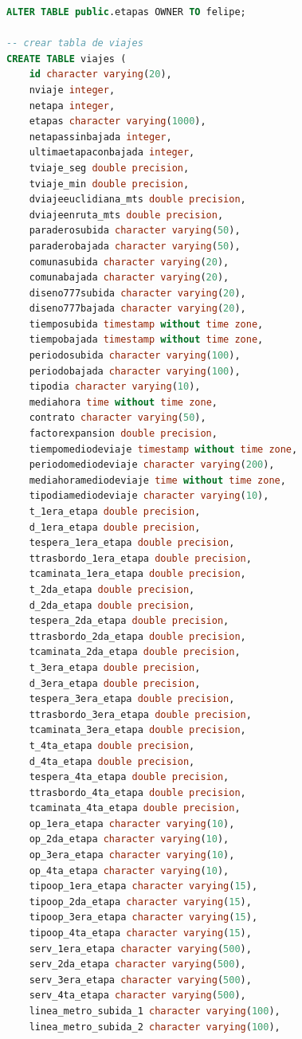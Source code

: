 \documentclass[12pt]{article}
\begin{document}
\begin{lstlisting}[breaklines=true, 
				   language=SQL,  
				   title=asd, 
				   caption=Instalacion de postgres,
				   label=fig:instalar_postgres]
ALTER TABLE public.etapas OWNER TO felipe;

-- crear tabla de viajes
CREATE TABLE viajes (
    id character varying(20),
    nviaje integer,
    netapa integer,
    etapas character varying(1000),
    netapassinbajada integer,
    ultimaetapaconbajada integer,
    tviaje_seg double precision,
    tviaje_min double precision,
    dviajeeuclidiana_mts double precision,
    dviajeenruta_mts double precision,
    paraderosubida character varying(50),
    paraderobajada character varying(50),
    comunasubida character varying(20),
    comunabajada character varying(20),
    diseno777subida character varying(20),
    diseno777bajada character varying(20),
    tiemposubida timestamp without time zone,
    tiempobajada timestamp without time zone,
    periodosubida character varying(100),
    periodobajada character varying(100),
    tipodia character varying(10),
    mediahora time without time zone,
    contrato character varying(50),
    factorexpansion double precision,
    tiempomediodeviaje timestamp without time zone,
    periodomediodeviaje character varying(200),
    mediahoramediodeviaje time without time zone,
    tipodiamediodeviaje character varying(10),
    t_1era_etapa double precision,
    d_1era_etapa double precision,
    tespera_1era_etapa double precision,
    ttrasbordo_1era_etapa double precision,
    tcaminata_1era_etapa double precision,
    t_2da_etapa double precision,
    d_2da_etapa double precision,
    tespera_2da_etapa double precision,
    ttrasbordo_2da_etapa double precision,
    tcaminata_2da_etapa double precision,
    t_3era_etapa double precision,
    d_3era_etapa double precision,
    tespera_3era_etapa double precision,
    ttrasbordo_3era_etapa double precision,
    tcaminata_3era_etapa double precision,
    t_4ta_etapa double precision,
    d_4ta_etapa double precision,
    tespera_4ta_etapa double precision,
    ttrasbordo_4ta_etapa double precision,
    tcaminata_4ta_etapa double precision,
    op_1era_etapa character varying(10),
    op_2da_etapa character varying(10),
    op_3era_etapa character varying(10),
    op_4ta_etapa character varying(10),
    tipoop_1era_etapa character varying(15),
    tipoop_2da_etapa character varying(15),
    tipoop_3era_etapa character varying(15),
    tipoop_4ta_etapa character varying(15),
    serv_1era_etapa character varying(500),
    serv_2da_etapa character varying(500),
    serv_3era_etapa character varying(500),
    serv_4ta_etapa character varying(500),
    linea_metro_subida_1 character varying(100),
    linea_metro_subida_2 character varying(100),

\end{lstlisting}
\end{document}
